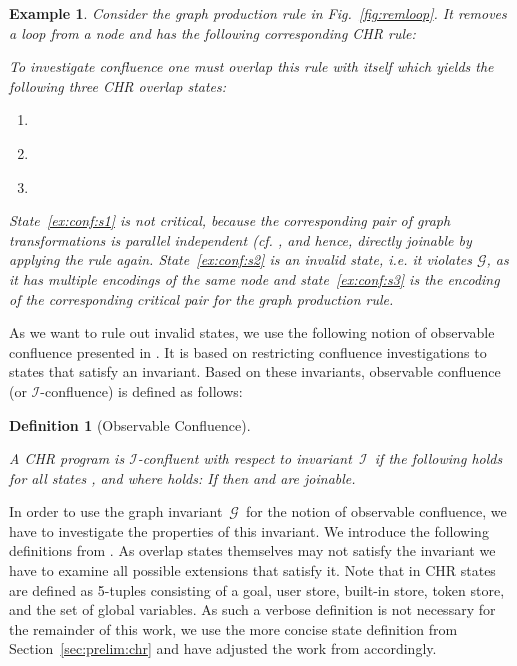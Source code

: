 \documentclass{tlp}
\newtheorem{example}{Example}[section]
\newtheorem{definition}{Definition}[section]
\newcommand{\mcI}{\ensuremath{\mathcal{I}}}
\newcommand{\mcG}{\ensuremath{\mathcal{G}}}
\begin{document}
\begin{example}\label{ex:confluence}
Consider the graph production rule in Fig.~\ref{fig:remloop}. It removes a
loop from a node and has the following corresponding CHR rule:

To investigate confluence one must overlap this rule with itself which yields the
following three CHR overlap states:
\begin{enumerate}
  \item \label{ex:conf:s1} 
  \item \label{ex:conf:s2} 
  \item \label{ex:conf:s3} 
\end{enumerate}

State~\eqref{ex:conf:s1} is not critical, because the corresponding pair of graph
transformations is parallel independent (cf. \cite{ehrigprangetaentzer06}, and
hence, directly joinable by applying the rule again. State~\eqref{ex:conf:s2} is
an invalid state, i.e. it violates \mcG, as it has multiple encodings of the same
node and state~\eqref{ex:conf:s3} is the encoding of the corresponding critical
pair for the graph production rule.
\end{example}

As we want to rule out invalid states, we use the following notion of observable
confluence presented in \cite{duckstuckeysulzmann07}. It is based on restricting
confluence investigations to states that satisfy an invariant. Based on these
invariants, observable confluence (or \mcI-confluence) is defined as follows:

\begin{definition}[Observable Confluence]\label{def:obs_conf}

A CHR program  is \mcI-confluent with respect to invariant~\mcI\ if the
following holds for all states , and  where
 holds: If  then
 and  are joinable.
\end{definition}

In order to use the graph invariant~\mcG\ for the notion of observable
confluence, we have to investigate the properties of this invariant. We introduce
the following definitions from \cite{duckstuckeysulzmann07}. As overlap states
themselves may not satisfy the invariant we have to examine all possible
extensions that satisfy it. Note that in \cite{duckstuckeysulzmann07} CHR states
are defined as 5-tuples consisting of a goal, user store, built-in store, token
store, and the set of global variables. As such a verbose definition is not
necessary for the remainder of this work, we use the more concise state
definition from Section~\ref{sec:prelim:chr} and have adjusted the work from
\cite{duckstuckeysulzmann07} accordingly.
\end{document}
